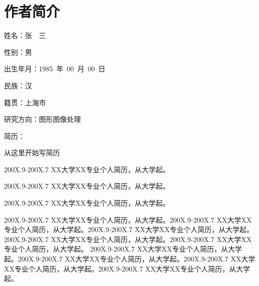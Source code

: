 
%
%

\chapter*{\hfill 作者简介 \hfill}
\begin{window}
\end{window}
\daxiaosi
姓名：张　三

性别：男

出生年月：1985~年~00~月~00~日

民族：汉

籍贯：上海市

研究方向：图形图像处理

简历：

\xiaosi
从这里开始写简历

200X.9-200X.7  XX大学XX专业个人简历，从大学起。

200X.9-200X.7  XX大学XX专业个人简历，从大学起。

200X.9-200X.7  XX大学XX专业个人简历，从大学起。

200X.9-200X.7  XX大学XX专业个人简历，从大学起。200X.9-200X.7  XX大学XX专业个人简历，从大学起。200X.9-200X.7  XX大学XX专业个人简历，从大学起。200X.9-200X.7  XX大学XX专业个人简历，从大学起。200X.9-200X.7  XX大学XX专业个人简历，从大学起。
200X.9-200X.7  XX大学XX专业个人简历，从大学起。200X.9-200X.7  XX大学XX专业个人简历，从大学起。200X.9-200X.7  XX大学XX专业个人简历，从大学起。200X.9-200X.7  XX大学XX专业个人简历，从大学起。
